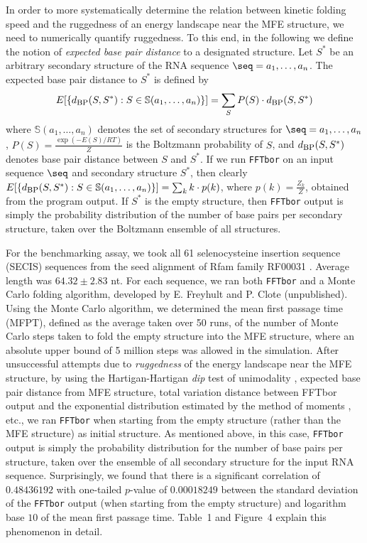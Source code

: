 In order to more systematically determine the relation between kinetic
folding speed and the ruggedness of an energy landscape near the MFE structure,
we need to numerically quantify ruggedness. To this end, in the following
we define the notion of {\em expected base pair distance} to a designated
structure. Let $S^*$ be an arbitrary secondary structure of the RNA sequence
$\seq = a_1,\dots,a_n$.
The expected base pair distance to $S^*$ is defined by
\begin{eqnarray}
\label{eq:expectedBasePairDist}
E[ \{ d_{\mbox{\sc bp}}(S,S^*): S \in \mathbb{S}(a_1,\ldots,a_n)\} ]  =
\sum_{S} P(S) \cdot d_{\mbox{\sc bp}}(S,S^*)
\end{eqnarray}
where
$\mathbb{S}(a_1,\ldots,a_n)$ denotes the set of secondary structures for
$\seq = a_1,\dots,a_n$, $P(S) = \frac{\exp(-E(S)/RT)}{Z}$ is the Boltzmann
probability of $S$, and
$d_{\mbox{\sc bp}}(S,S^*)$ denotes base pair distance between $S$ and $S^*$.
If we run {\tt FFTbor} on an input sequence $\seq$ and secondary structure
$S^*$, then clearly
$E[ \{ d_{\mbox{\sc bp}}(S,S^*): S \in \mathbb{S}(a_1,\ldots,a_n)\} ]  =
\sum_{k} k \cdot p(k)$, where $p(k)=\frac{Z_k}{Z}$, obtained from the
program output.  If $S^*$ is the empty structure, then {\tt FFTbor} output
is simply the probability distribution of the number of base pairs per
secondary structure, taken over the Boltzmann ensemble of all structures.

For the benchmarking assay, we took all 61 selenocysteine insertion sequence
(SECIS) sequences from the seed alignment of Rfam family RF00031
\cite{Gardner.nar11}. Average length was $64.32 \pm 2.83$ nt.
For each sequence, we ran both {\tt FFTbor} and a Monte Carlo
folding algorithm, developed by E. Freyhult and P. Clote (unpublished).
Using the Monte Carlo algorithm, we
determined the mean first passage time (MFPT), defined as the average
taken over 50 runs, of the number of Monte Carlo steps taken to fold
the empty structure into the MFE structure, where an absolute upper bound
of 5 million steps was allowed in the simulation.  After unsuccessful
attempts due to {\em ruggedness} of the energy landscape near the MFE structure,
by using the Hartigan-Hartigan {\em dip} test of unimodality
\cite{hartiganDipTest},
expected base pair distance from MFE structure, total variation distance
between FFTbor output and the exponential distribution estimated by
the method of moments \cite{zar:biostatistics}, etc.,
we ran {\tt FFTbor}
when starting from the empty structure (rather than the MFE structure)
as initial structure.
As mentioned above, in this case, {\tt FFTbor} output is simply
the probability distribution
for the number of base pairs per structure, taken over the ensemble
of all secondary structure for the input RNA
sequence. Surprisingly, we found that there is a significant
correlation of  $0.48436192$ with one-tailed
$p$-value of $0.00018249$ between the
standard deviation of the {\tt FFTbor} output (when starting from the
empty structure) and logarithm base $10$ of the mean first passage time.
Table~1 and Figure~4 explain this phenomenon in detail.

